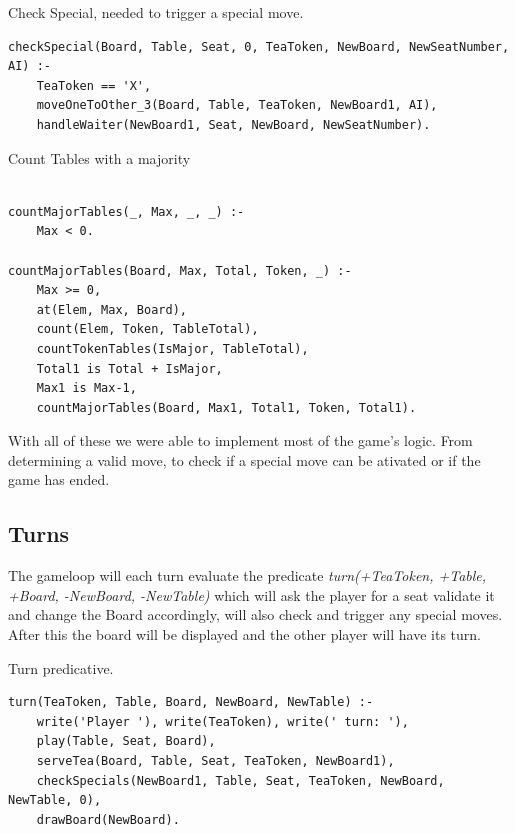\documentclass[a4paper]{article}
\begin{document}
        \begin{listing}[H]
        \caption{Check Special, needed to trigger a special move.}
        \label{Codigo:cod_chekspecial}
        \begin{verbatim}
checkSpecial(Board, Table, Seat, 0, TeaToken, NewBoard, NewSeatNumber, AI) :-
    TeaToken == 'X',
    moveOneToOther_3(Board, Table, TeaToken, NewBoard1, AI),
    handleWaiter(NewBoard1, Seat, NewBoard, NewSeatNumber).

        \end{verbatim}

        \end{listing}

        \begin{listing}[H]
        \caption{Count Tables with a majority}
        \label{Codigo:cod_major}
        \begin{verbatim}

countMajorTables(_, Max, _, _) :-
    Max < 0.

countMajorTables(Board, Max, Total, Token, _) :-
    Max >= 0,
    at(Elem, Max, Board),
    count(Elem, Token, TableTotal),
    countTokenTables(IsMajor, TableTotal),
    Total1 is Total + IsMajor,
    Max1 is Max-1,
    countMajorTables(Board, Max1, Total1, Token, Total1).

        \end{verbatim}

        \end{listing}


With all of these we were able to implement most of the game's logic. From determining a valid move,
to check if a special move can be ativated or if the game has ended.


\subsection{Turns}

The gameloop will each turn evaluate the predicate \textit{turn(+TeaToken, +Table, +Board, -NewBoard, -NewTable)}
 which will ask the player for a seat validate it and change the Board accordingly, will also check and trigger any special moves.
  After this the board will be displayed
  and the other player will have its turn.

    \begin{listing}[H]
            \caption{Turn predicative.}
            \label{Codigo:cod_turn}
            \begin{verbatim}
turn(TeaToken, Table, Board, NewBoard, NewTable) :-
    write('Player '), write(TeaToken), write(' turn: '),
    play(Table, Seat, Board),
    serveTea(Board, Table, Seat, TeaToken, NewBoard1),
    checkSpecials(NewBoard1, Table, Seat, TeaToken, NewBoard, NewTable, 0),
    drawBoard(NewBoard).

    \end{verbatim}

    \end{listing}
\end{document}
